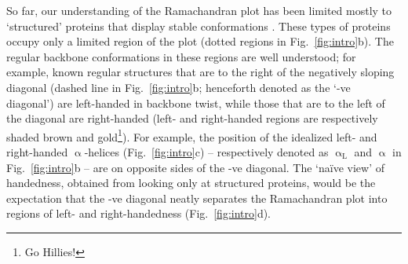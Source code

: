 \documentclass[fleqn,10pt,lineno]{wlpeerj} %
\newcommand{\n}[1]{{\color{black}#1}} %
\newcommand{\Fig}[1]{Fig.~\ref{#1}}
\begin{document}
So far, our understanding of the Ramachandran plot has been limited mostly to \n{`structured' proteins that display stable conformations \citep{Berman2000,Alberts2002}. These types of proteins occupy only a limited region of the plot (dotted regions in \Fig{fig:intro}b). The regular backbone conformations in these regions are well understood; for example, known regular structures that are to the right of the negatively sloping diagonal (dashed line in \Fig{fig:intro}b; henceforth denoted as the `-ve diagonal') are left-handed in backbone twist, while those that are to the left of the diagonal are right-handed (left- and right-handed regions are respectively shaded brown and gold\footnote{Go Hillies!}).} For example, the position of the idealized left- and right-handed $\upalpha$-helices (\Fig{fig:intro}c) -- respectively denoted as $\upalpha_\textrm{L}$ and $\upalpha$ in \Fig{fig:intro}b -- are on opposite sides of the -ve diagonal. \n{The `na{\"i}ve view' of handedness, obtained from looking only at structured proteins, would be the expectation that the -ve diagonal neatly separates the Ramachandran plot into regions of left- and right-handedness (\Fig{fig:intro}d).}

\end{document}
